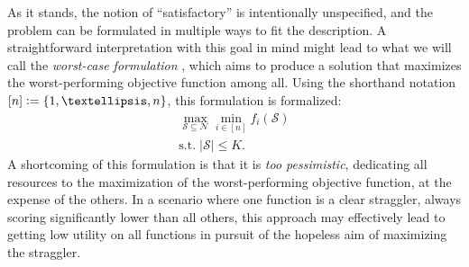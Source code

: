 \documentclass[letter,11pt]{article}
\def\sS{\mathcal{S}}
\def\sN{\mathcal{N}}
\begin{document}
As it stands, the notion of ``satisfactory'' is intentionally unspecified, and the problem can be formulated in multiple ways to fit the description. A straightforward interpretation with this goal in mind might lead to what we will call the \textit{worst-case formulation} \cite{krause2014submodular, ben2009robust, ben2002robust, NEURIPS2018_7e448ed9}, which aims to produce a solution that maximizes the worst-performing objective function among all. Using the shorthand notation $[n] \vcentcolon= \{1, \ldots, n\}$, this formulation is formalized:
\begin{equation}
\begin{gathered}
\max_{\sS \subseteq \sN} \min_{i \in [n]} f_i(\sS) \label{robust-first}\\
\text{s.t.}\; \lvert \sS\rvert \leq K.
\end{gathered}
\end{equation}
A shortcoming of this formulation is that it is \textit{too pessimistic}\cite{malherbe2022robustness}, dedicating all resources to the maximization of the worst-performing objective function, at the expense of the others. In a scenario where one function is a clear straggler, always scoring significantly lower than all others, this approach may effectively lead to getting low utility on all functions in pursuit of the hopeless aim of maximizing the straggler.
\end{document}
